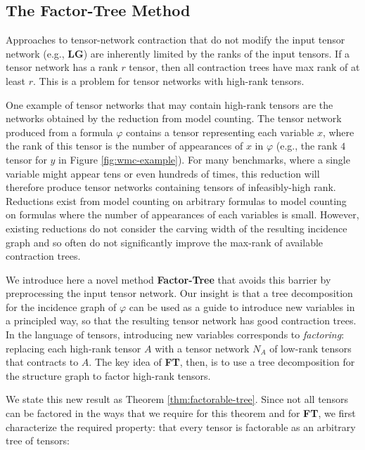 \subsection{The Factor-Tree Method}
\label{sec:tensors:preprocessing}
Approaches to tensor-network contraction that do not modify the input tensor network (e.g., \textbf{LG}) are inherently limited by the ranks of the input tensors. If a tensor network has a rank $r$ tensor, then all contraction trees have max rank of at least $r$. This is a problem for tensor networks with high-rank tensors. 

One example of tensor networks that may contain high-rank tensors are the networks obtained by the reduction from model counting. The tensor network produced from a formula $\varphi$ contains a tensor representing each variable $x$, where the rank of this tensor is the number of appearances of $x$ in $\varphi$ (e.g., the rank $4$ tensor for $y$ in Figure \ref{fig:wmc-example}). For many benchmarks, where a single variable might appear tens or even hundreds of times, this reduction will therefore produce tensor networks containing tensors of infeasibly-high rank. Reductions exist from model counting on arbitrary formulas to model counting on formulas where the number of appearances of each variables is small. However, existing reductions do not consider the carving width of the resulting incidence graph and so often do not significantly improve the max-rank of available contraction trees. 

We introduce here a novel method \textbf{Factor-Tree} that avoids this barrier by preprocessing the input tensor network. Our insight is that a tree decomposition for the incidence graph of $\varphi$ can be used as a guide to introduce new variables in a principled way, so that the resulting tensor network has good contraction trees. In the language of tensors, introducing new variables corresponds to \emph{factoring}: replacing each high-rank tensor $A$ with a tensor network $N_A$ of low-rank tensors that contracts to $A$. The key idea of \textbf{FT}, then, is to use a tree decomposition for the structure graph to factor high-rank tensors.

We state this new result as Theorem \ref{thm:factorable-tree}. Since not all tensors can be factored in the ways that we require for this theorem and for \textbf{FT}, we first characterize the required property: that every tensor is factorable as an arbitrary tree of tensors:


